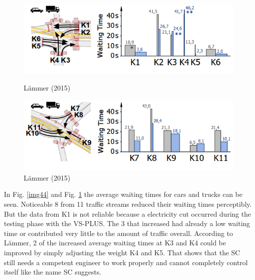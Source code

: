 \begin{figure} [!htb]
	\centering
	\includegraphics[scale=0.43]{pic/k6_waiting.png}
	\caption{ L\"ammer (2015) \cite{laemmer15}}
	\label{img44}

	\centering
	\includegraphics[scale=0.43]{pic/k7_waiting.png}
	\caption{L\"ammer (2015) \cite{laemmer15}}
	\label{img34}
\end{figure}

In Fig. \ref{img44} and Fig. \ref{img34} the average waiting times for cars and trucks can be seen. Noticeable 8 from 11 traffic streams reduced their waiting times perceptibly. But the data from K1 is not reliable because a electricity cut occurred during the testing phase with the VS-PLUS. The 3 that increased had already a low waiting time or contributed very little to the amount of traffic overall. According to L\"ammer, 2 of the increased average waiting times at K3 and K4 could be improved by simply adjusting the weight K4 and K5. That shows that the SC still needs a competent engineer to work properly and cannot completely control itself like the name SC suggests.

